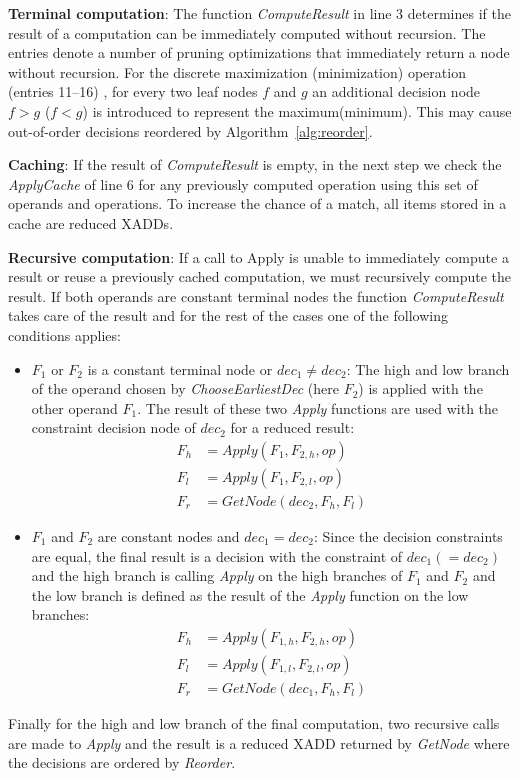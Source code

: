 \documentclass[twoside,11pt]{article}
\begin{document}
\textbf{Terminal computation}: 
The function \emph{ComputeResult} in line 3 determines if the result of a computation can be immediately computed without recursion. The entries denote a number of pruning optimizations that immediately return a node without recursion. For the discrete maximization (minimization) operation (entries 11--16) , for every two leaf nodes $f$ and $g$ an additional decision node $f > g$ ($f < g$) is introduced to represent the maximum(minimum). This may cause out-of-order decisions reordered by Algorithm~\ref{alg:reorder}. 

\textbf{Caching}:
If the result of 	\emph{ComputeResult} is empty, in the next step we check the \emph{ApplyCache} of line 6 for any previously computed operation using this set of operands and operations. To increase the chance of a match, all items stored in a cache are reduced XADDs.

\textbf{Recursive computation}:
If a call to Apply is unable to immediately compute a result or reuse a previously cached computation, we must recursively compute the result. If both operands are constant terminal nodes the function \emph{ComputeResult} takes care of the result and for the rest of the cases one of the following conditions applies: 
\begin{itemize}
\item $F_1$ or $F_2$ is a constant terminal node or $\mathit{dec}_1\neq \mathit{dec}_2 $: The high and low branch of the operand chosen by \emph{ChooseEarliestDec} (here $F_2$) is applied with the other operand $F_1$. The result of these two \emph{Apply} functions are used with the constraint decision node of $\mathit{dec}_2$ for a reduced result:
\begin{align*}
F_h &= Apply (F_1 , F_{2,h},op) \\
F_l &= Apply (F_1 , F_{2,l},op)  \\
F_r &= GetNode (\mathit{dec}_2 , F_h,F_l) 
\end{align*}
\item $F_1$ and $F_2$ are constant nodes and $\mathit{dec}_1=\mathit{dec}_2 $: Since the decision constraints are equal, the final result is a decision with the constraint of $\mathit{dec}_1 (=\mathit{dec}_2)$ and the high branch is calling \emph{Apply} on the high branches of $F_1$ and $F_2$ and the low branch is defined as the result of the \emph{Apply} function on the low branches:
\begin{align*}
F_h &= Apply (F_{1,h} , F_{2,h},op)  \\
F_l &= Apply (F_{1,l} , F_{2,l},op)  \\
F_r &= GetNode (\mathit{dec}_1 , F_h,F_l) 
\end{align*}
\end{itemize}
Finally for the high and low branch of the final computation, two recursive calls are made to \emph{Apply} and the result is a reduced XADD returned by \emph{GetNode} where the decisions are ordered by \emph{Reorder}. 
\end{document}

